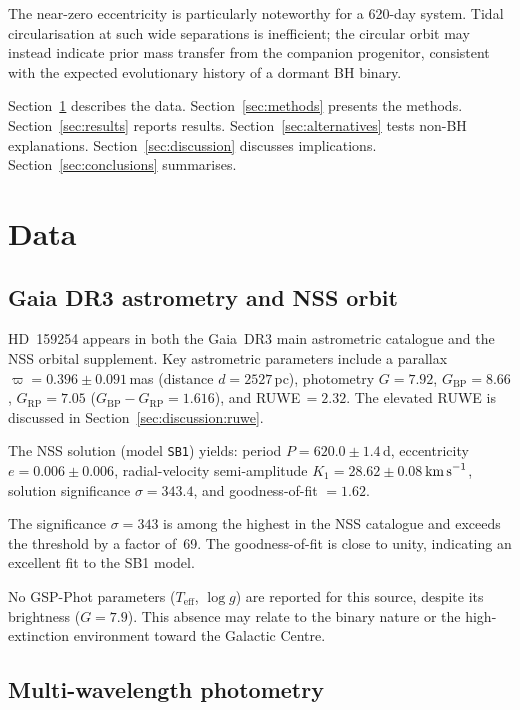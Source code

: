 \documentclass[usenatbib,fleqn]{mnras}
\newcommand{\kms}{{\rm km\,s}^{-1}}
\begin{document}
The near-zero eccentricity is particularly noteworthy for a 620-day
system.  Tidal circularisation at such wide separations is
inefficient; the circular orbit may instead indicate prior mass
transfer from the companion progenitor, consistent with the expected
evolutionary history of a dormant BH binary.

Section~\ref{sec:data} describes the data.
Section~\ref{sec:methods} presents the methods.
Section~\ref{sec:results} reports results.
Section~\ref{sec:alternatives} tests non-BH explanations.
Section~\ref{sec:discussion} discusses implications.
Section~\ref{sec:conclusions} summarises.

\section{Data}
\label{sec:data}

\subsection{Gaia DR3 astrometry and NSS orbit}
\label{sec:data:gaia}

HD~159254 appears in both the Gaia~DR3 main astrometric catalogue
and the NSS orbital supplement.  Key astrometric parameters include
a parallax $\varpi = 0.396 \pm 0.091$\,mas (distance
$d = 2527$\,pc), photometry $G = 7.92$,
$G_\mathrm{BP} = 8.66$, $G_\mathrm{RP} = 7.05$
($G_\mathrm{BP} - G_\mathrm{RP} = 1.616$), and RUWE\,$= 2.32$.
The elevated RUWE is discussed in
Section~\ref{sec:discussion:ruwe}.

The NSS solution (model \texttt{SB1}) yields:
period $P = 620.0 \pm 1.4$\,d,
eccentricity $e = 0.006 \pm 0.006$,
radial-velocity semi-amplitude $K_1 = 28.62 \pm 0.08$\,$\kms$,
solution significance $\sigma = 343.4$, and
goodness-of-fit $= 1.62$.

The significance $\sigma = 343$ is among the highest in the NSS
catalogue and exceeds the threshold by a factor of~69.  The
goodness-of-fit is close to unity, indicating an excellent fit to
the SB1 model.

No GSP-Phot parameters ($T_\mathrm{eff}$, $\log g$) are reported
for this source, despite its brightness ($G = 7.9$).  This absence
may relate to the binary nature or the high-extinction environment
toward the Galactic Centre.

\subsection{Multi-wavelength photometry}
\label{sec:data:phot}
\end{document}
